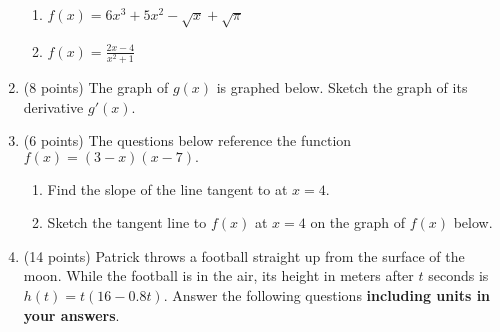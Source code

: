 \documentclass[12pt]{article}
\begin{document}
\begin{enumerate}
	\begin{enumerate}

	\item $f(x)=6x^3+5x^2-\sqrt{x}+\sqrt{\pi}$\\ \vfill

	\item $f(x)=\frac{2x-4}{x^2+1}$\\ \vfill

\end{enumerate}
\item (8 points) The graph of $g(x)$ is graphed below. Sketch the graph of its derivative $g'(x)$.

\begin{center}
 \end{center}

\newpage
\item (6 points) The questions below reference the function $f(x)=(3-x)(x-7).$ 
	\begin{enumerate}
	\item Find the slope of the line tangent to at $x=4$. 
	\vfill
	
	\item Sketch the tangent line to $f(x)$ at $x=4$ on the graph of $f(x)$ below.

\begin{center}
 \end{center}
\end{enumerate}
\item (14 points) Patrick throws a football straight up from the surface of the moon. While the football is in the air, its height in meters after $t$ seconds is $h(t)=t(16-0.8t)$. Answer the following questions {\bf including units in your answers}.


\end{enumerate}
\end{document}
